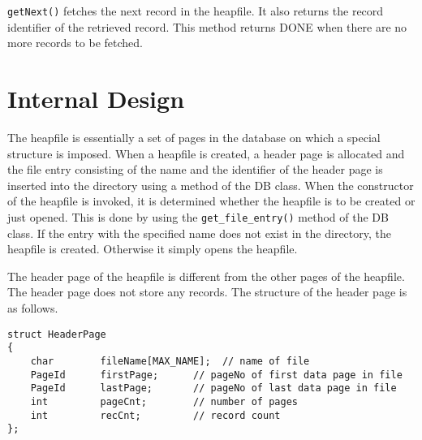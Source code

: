 {\tt  getNext()} fetches  the  next record  in the  heapfile.  It also
returns the  record  identifier of  the  retrieved record. This method
returns DONE when there are no more records to be fetched.

\section{Internal Design}

The heapfile is essentially a set of pages  in the database on which a
special structure  is imposed.  When a heapfile   is created, a header
page is allocated and  the file entry consisting  of the name  and the
identifier of  the header page is  inserted into the directory using a
method  of the  DB class.  When  the  constructor of  the heapfile  is
invoked, it is  determined whether  the heapfile is  to be  created or
just  opened. This is done by  using the {\tt get\_file\_entry()} method
of the DB class.  If the entry with the  specified name does not exist
in the directory,  the heapfile is  created. Otherwise it simply opens
the heapfile.

The header page  of the heapfile is  different from the other pages of
the heapfile.  The  header   page  does  not store  any  records.  The
structure of the header page is as follows.

\begin{verbatim}
struct HeaderPage
{
    char        fileName[MAX_NAME];  // name of file
    PageId      firstPage;      // pageNo of first data page in file
    PageId      lastPage;       // pageNo of last data page in file
    int         pageCnt;        // number of pages
    int         recCnt;         // record count
};
\end{verbatim}

